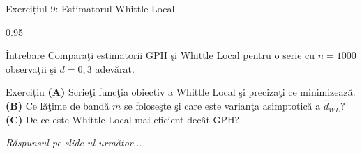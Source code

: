 \documentclass[9pt, aspectratio=169, t]{beamer}
\begin{document}
\begin{frame}{Exercițiul 9: Estimatorul Whittle Local}
    \begin{cminipage}{0.95\textwidth}
    \begin{alertblock}{Întrebare}
        Comparaţi estimatorii GPH şi Whittle Local pentru o serie cu $n = 1000$ observaţii şi $d = 0{,}3$ adevărat.
    \end{alertblock}

    \vspace{0.2cm}

    \begin{block}{Exercițiu}
        \textcolor{MainBlue}{\textbf{(A)}} Scrieţi funcţia obiectiv a Whittle Local şi precizaţi ce minimizează.\\[3pt]
        \textcolor{MainBlue}{\textbf{(B)}} Ce lăţime de bandă $m$ se foloseşte şi care este varianţa asimptotică a $\hat{d}_{WL}$?\\[3pt]
        \textcolor{MainBlue}{\textbf{(C)}} De ce este Whittle Local mai eficient decât GPH?
    \end{block}

    \vspace{0.3cm}

    \begin{center}
        \textit{Răspunsul pe slide-ul următor...}
    \end{center}
    \end{cminipage}
\end{frame}
\end{document}
